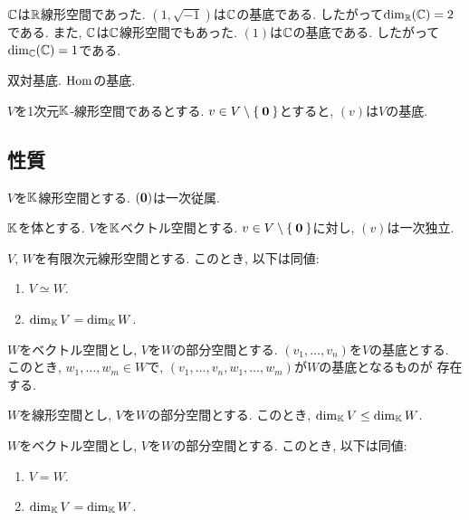\begin{example}
  $\mathbb{C}$は$\mathbb{R}$線形空間であった.
  $(1,\sqrt{-1})$は$\mathbb{C}$の基底である.
  したがって$\dim_{\mathbb{R}}(\mathbb{C}) = 2$である.
  また,
  $\mathbb{C}$は$\mathbb{C}$線形空間でもあった.
  $(1)$は$\mathbb{C}$の基底である.
  したがって$\dim_{\mathbb{C}}(\mathbb{C}) = 1$である.
\end{example}


\begin{example}
双対基底.  $\operatorname{Hom}$の基底.
\end{example}


\begin{example}
  $V$を1次元$\mathbb{K}$-線形空間であるとする.
  $v\in V\setminus \Set{\boldsymbol{0}}$とすると,
  $(v)$は$V$の基底.
\end{example}


\subsection{性質}
\begin{prop}
  $V$を$\mathbb{K}$線形空間とする.
  $(\boldsymbol{0})$は一次従属.
\end{prop}
  
\begin{prop}
  $\mathbb{K}$を体とする.
  $V$を$\mathbb{K}$ベクトル空間とする.
  $v\in V\setminus\Set{\boldsymbol{0}}$に対し,
  $(v)$は一次独立.
\end{prop}

\begin{prop}
  $V$, $W$を有限次元線形空間とする.
  このとき, 以下は同値:
  \begin{enumerate}
  \item $V\simeq W$.
  \item $\dim_{\mathbb{K}} V = \dim_{\mathbb{K}} W$.
  \end{enumerate}
\end{prop}

\begin{prop}
  $W$をベクトル空間とし, $V$を$W$の部分空間とする.
  $(v_1,\ldots,v_n)$を$V$の基底とする.
  このとき,
  $w_1,\ldots,w_m\in W$で,
  $(v_1,\ldots,v_n,w_1,\ldots,w_m)$が$W$の基底となるものが
  存在する.  
\end{prop}

\begin{prop}
  $W$を線形空間とし, $V$を$W$の部分空間とする.
  このとき,  $\dim_{\mathbb{K}} V \leq \dim_{\mathbb{K}} W$.
\end{prop}

\begin{prop}
  $W$をベクトル空間とし, $V$を$W$の部分空間とする.
  このとき, 以下は同値:
  \begin{enumerate}
   \item $V = W$.
   \item $\dim_{\mathbb{K}} V = \dim_{\mathbb{K}} W$.
  \end{enumerate}
\end{prop}

